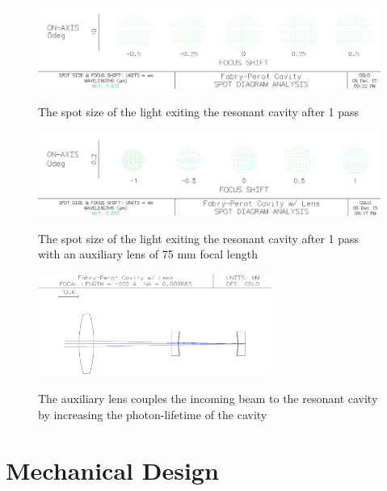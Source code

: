 \documentclass[12pt,journal]{IEEEtran}
\begin{document}
\begin{figure}[tb]
  \centering
	\includegraphics[width=6.5in]{./cavity/spot_size.png}\\
	\caption[Resonant Cavity Setup]{The spot size of the light exiting the resonant cavity after 1 pass}
	\label{fig:mirror-setup}
\end{figure}

\begin{figure}[tb]
  \centering
	\includegraphics[width=6.5in]{./cavity/auxiliary_lens_spot_size.png}\\
	\caption[Resonant Cavity Setup]{The spot size of the light exiting the resonant cavity after 1 pass with an auxiliary lens of 75 mm focal length}
	\label{fig:aux-mirror-setup}
\end{figure}

\begin{figure}[h!]
  \centering
	\includegraphics[width=3in]{./cavity/auxiliary_lens_resonant.png}\\
	\caption[Auxiliary Lens Setup]{The auxiliary lens couples the incoming beam to the resonant cavity by increasing the photon-lifetime of the cavity}
	\label{fig:beam-diameter}
\end{figure}


\section{Mechanical Design} \label{ss:mechanical_design}
\end{document}
